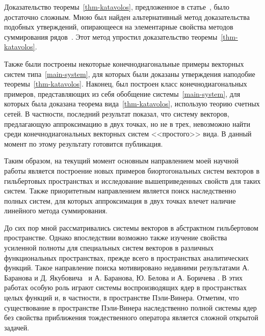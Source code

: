 \documentclass[a4paper,12pt]{article}
\numberwithin{prop_under_lemma}{lemma}
\begin{document}
Доказательство теоремы~\ref{thm-katavolos}, предложенное в статье~\cite{katavolos}, было достаточно сложным.
Мною был найден альтернативный метод доказательства подобных утверждений,
  опирающееся на элементарные свойства методов суммирования рядов~\cite{my1}.
Этот метод упростил доказательство теоремы~\ref{thm-katavolos}.

Также были построены некоторые конечнодиагональные примеры векторных систем типа~\eqref{main-system}, для которых были доказаны утверждения наподобие теоремы~\ref{thm-katavolos}.
Наконец, был построен класс конечнодиагональных примеров, представляющих из себя обобщение системы~\eqref{main-system}, для которых была доказана теорема вида~\ref{thm-katavolos},
  использую теорию счетных сетей.
В частности, последний результат показал, что систему векторов, предлагающую аппроксимацию в двух точках, но не в трех, невозможно найти среди конечнодиагональных векторных систем
  <<простого>> вида.
В данный момент по этому результату готовится публикация.

Таким образом, на текущий момент основным направлением моей научной работы является построение новых примеров биортогональных систем векторов 
  в гильбертовых пространствах и исследование вышеприведенных свойств для таких систем.
Также приоритетным направлением является поиск наследственно полных систем, для которых аппроксимация в двух точках влечет наличие линейного метода суммирования.
  
До сих пор мной рассматривались системы векторов в абстрактном гильбертовом пространстве.
Однако впоследствии возможно также изучение свойства усиленной полноты для специальных систем векторов в различных функциональных пространствах,
  прежде всего в пространствах аналитических функций.
Такое направление поиска мотивировано недавними результатами А. Баранова и Д. Якубовича~\cite{ad} и А. Баранова, Ю. Белова и А. Боричева \cite{bbb}.
В этих работах особую роль играют системы воспроизводящих ядер в пространствах целых функций и, в частности, в пространстве Пэли-Винера.
Отметим, что существование в пространстве Пэли-Винера наследственно полной системы ядер без свойства приближения тождественного оператора является сложной открытой задачей.
\end{document}
